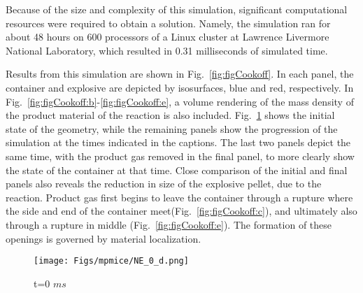 Because of the size and complexity of this simulation, significant
computational resources were required to obtain a solution.  Namely,
the simulation ran for about 48 hours on 600 processors of a Linux
cluster at Lawrence Livermore National Laboratory, which resulted in
0.31 milliseconds of simulated time.

Results from this simulation are shown in Fig.~\ref{fig:figCookoff}.  In
each panel, the container and explosive are depicted by isosurfaces,
blue and red, respectively.  In Fig.~\ref{fig:figCookoff:b}-\ref{fig:figCookoff:e},
a volume rendering of the mass density of the product material of the
reaction is also included.  Fig.~\ref{fig:figCookoff:a} shows the initial
state of the geometry, while the remaining panels show the progression
of the simulation at the times indicated in the captions.  The last
two panels depict the same time, with the product gas removed in the
final panel, to more clearly show the state of the container at that
time.  Close comparison of the initial and final panels also reveals
the reduction in size of the explosive pellet, due to the reaction.
Product gas first begins to leave the container through a
rupture where the side and end of the container
meet(Fig.~\ref{fig:figCookoff:c}), and ultimately
also through a rupture in middle (Fig.~\ref{fig:figCookoff:e}).  The
formation of these openings is governed by material localization.

\begin{figure}[htbp!]
  \centering
  \texttt{[image: Figs/mpmice/NE\_0\_d.png]}
  \caption{t=0 $ms$}
  \label{fig:figCookoff:a}
\end{figure}

